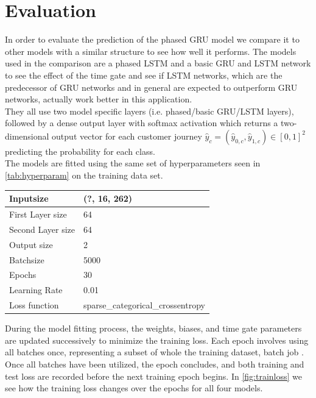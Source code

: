 \section{Evaluation}
In order to evaluate the prediction of the phased GRU model we compare it to other models with a similar structure to see how well it performs. 
The models used in the comparison are a phased LSTM and a basic GRU and LSTM network to see the effect of the time gate and see if LSTM networks, which are the predecessor of GRU networks and in general are expected to outperform GRU networks, actually work better in this application.\\
They all use two model specific layers (i.e. phased/basic GRU/LSTM layers), followed by a dense output layer with softmax activation which returns a two-dimensional output vector for each customer journey $\hat{y}_c = (\hat{y}_{0,c}, \hat{y}_{1,c})\in [0,1]^2$ predicting the probability for each class. \\
The models are fitted using the same set of hyperparameters seen in \ref{tab:hyperparam} on the training data set. 
\begin{center}
\begin{tabular}{ |m{4cm}|m{6cm}| } 
  \hline 
  Inputsize & (?, 16, 262) \\
  \hline
  First Layer size & 64 \\ 
  \hline
  Second Layer size  & 64 \\ 
  \hline
  Output size & 2 \\ 
  \hline
  Batchsize & 5000  \\ 
  \hline
  Epochs & 30 \\ 
  \hline
  Learning Rate & 0.01 \\ 
  \hline
  Loss function & sparse\_categorical\_crossentropy \\ 
  \hline
\end{tabular}
\label{tab:hyperparam}
\end{center} 
\vspace{0.5cm}
During the model fitting process, the weights, biases, and time gate parameters are updated successively to minimize the training loss. Each epoch involves using all batches once, representing a subset of whole the training dataset, \color{red} batch job \color{black}. Once all batches have been utilized, the epoch concludes, and both training and test loss are recorded before the next training epoch begins. In \ref{fig:trainloss} we see how the training loss changes over the epochs for all four models.\\
  

